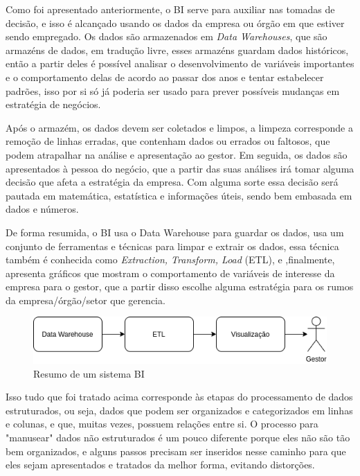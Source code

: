 Como foi apresentado anteriormente, o BI serve para auxiliar nas tomadas de decisão, e isso é alcançado usando os dados da empresa ou órgão em que estiver sendo empregado. Os dados são armazenados em \textit{Data Warehouses}, que são armazéns de dados, em tradução livre, esses armazéns guardam dados históricos, então a partir deles é possível analisar o desenvolvimento de variáveis importantes e o comportamento delas de acordo ao passar dos anos e tentar estabelecer padrões, isso por si só já poderia ser usado para prever possíveis mudanças em estratégia de negócios. 

Após o armazém, os dados devem ser coletados e limpos, a limpeza corresponde a remoção de linhas erradas, que contenham dados ou errados ou faltosos, que podem atrapalhar na análise e apresentação ao gestor. Em seguida, os dados são apresentados à pessoa do negócio, que a partir das suas análises irá tomar alguma decisão que afeta a estratégia da empresa. Com alguma sorte essa decisão será pautada em matemática, estatística e informações úteis, sendo bem embasada em dados e números.

De forma resumida, o BI usa o Data Warehouse para guardar os dados, usa um conjunto de ferramentas e técnicas para limpar e extrair os dados, essa técnica também é conhecida como \textit{Extraction, Transform, Load} (ETL), e ,finalmente, apresenta gráficos que mostram o comportamento de variáveis de interesse da empresa para o gestor, que a partir disso escolhe alguma estratégia para os rumos da empresa/órgão/setor que gerencia.

\begin{figure}[h]
	\centering
	\includegraphics[scale=0.80]{./figures/cap1/resumo_bi.png}
	\caption{Resumo de um sistema BI}
\end{figure}

Isso tudo que foi tratado acima corresponde às etapas do processamento de dados estruturados, ou seja, dados que podem ser organizados e categorizados em linhas e colunas, e que, muitas vezes, possuem relações entre si. O processo para "manusear" dados não estruturados é um pouco diferente porque eles não são tão bem organizados, e alguns passos precisam ser inseridos nesse caminho para que eles sejam apresentados e tratados da melhor forma, evitando distorções.

